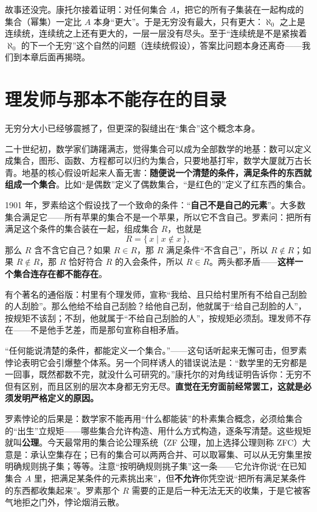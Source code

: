 故事还没完。康托尔接着证明：对任何集合 $A$，把它的所有子集装在一起构成的集合（幂集）一定比 $A$ 本身“更大”。于是无穷没有最大，只有更大：$\aleph_0$ 之上是连续统，连续统之上还有更大的，一层一层没有尽头。至于“连续统是不是紧挨着 $\aleph_0$ 的下一个无穷”这个自然的问题（连续统假设），答案比问题本身还离奇——我们到本章后面再揭晓。

\section{理发师与那本不能存在的目录}

无穷分大小已经够震撼了，但更深的裂缝出在“集合”这个概念本身。

二十世纪初，数学家们踌躇满志，觉得集合可以成为全部数学的地基：数可以定义成集合，图形、函数、方程都可以归约为集合，只要地基打牢，数学大厦就万古长青。地基的核心假设听起来人畜无害：\textbf{随便说一个清楚的条件，满足条件的东西就组成一个集合}。比如“是偶数”定义了偶数集合，“是红色的”定义了红东西的集合。

1901 年，罗素给这个假设找了一个致命的条件：“\textbf{自己不是自己的元素}”。大多数集合满足它——所有苹果的集合不是一个苹果，所以它不含自己。罗素问：把所有满足这个条件的集合装在一起，组成集合 $R$，也就是
\[
R = \{\, x \mid x \notin x \,\},
\]
那么 $R$ 含不含它自己？如果 $R \in R$，那 $R$ 满足条件“不含自己”，所以 $R \notin R$；如果 $R \notin R$，那 $R$ 恰好符合 $R$ 的入会条件，所以 $R \in R$。两头都矛盾——\textbf{这样一个集合连存在都不能存在}。

有个著名的通俗版：村里有个理发师，宣称“我给、且只给村里所有不给自己刮脸的人刮脸”。那么他给不给自己刮脸？给他自己刮，他就属于“给自己刮脸的人”，按规矩不该刮；不刮，他就属于“不给自己刮脸的人”，按规矩必须刮。理发师不存在——不是他手艺差，而是那句宣称自相矛盾。

\begin{fanli}
“任何能说清楚的条件，都能定义一个集合。”——这句话听起来无懈可击，但罗素悖论表明它会引爆整个体系。另一个同样诱人的错误说法是：“数学里的无穷都是一回事，既然都数不完，就没什么可研究的。”康托尔的对角线证明告诉你：无穷不但有区别，而且区别的层次本身都无穷无尽。\textbf{直觉在无穷面前经常罢工，这就是必须发明严格定义的原因。}
\end{fanli}

罗素悖论的后果是：数学家不能再用“什么都能装”的朴素集合概念，必须给集合的“出生”立规矩——哪些集合允许构造、用什么方式构造，逐条写清楚。这些规矩就叫\textbf{公理}。今天最常用的集合论公理系统（ZF 公理，加上选择公理则称 ZFC）大意是：承认空集存在；已有的集合可以两两合并、可以取幂集、可以从无穷集里按明确规则挑子集；等等。注意“按明确规则挑子集”这一条——它允许你说“在已知集合 $A$ 里，把满足某条件的元素挑出来”，但\textbf{不允许}你凭空说“把所有满足某条件的东西都收集起来”。罗素那个 $R$ 需要的正是后一种无法无天的收集，于是它被客气地拒之门外，悖论烟消云散。

